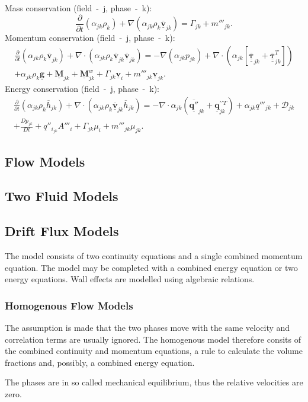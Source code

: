 \documentclass[11pt]{article}
\begin{document}
Mass conservation (field~-~j, phase~-~k):
\begin{equation}
	\frac{\partial}{\partial t}(\alpha_{jk} \rho_{k}) + \nabla (\alpha_{jk} \rho_{k} \overline{\mathbf{\underline{v}}}_{jk}) = \Gamma_{jk} + m'''_{jk}.
\end{equation}
Momentum conservation (field~-~j, phase~-~k):
\begin{multline}
	\frac{\partial}{\partial t}(\alpha_{jk} \rho_{k} \overline{\mathbf{\underline{v}}}_{jk}) + \nabla \cdot (\alpha_{jk} \rho_{k} \overline{\mathbf{\underline{v}}}_{jk} \overline{\mathbf{\underline{v}}}_{jk}) = 
	-\nabla(\alpha_{jk} p_{jk}) + \nabla \cdot (\alpha_{jk} [\underline{\underline{\overline{\mathbf{\tau}}}}_{jk} + \underline{\underline{\overline{\mathbf{\tau}}}}_{jk}^{T}])\\
	+ \alpha_{jk} \rho_{k} \underline{\mathbf{g}} + \underline{\mathbf{M}}_{jk} + \underline{\mathbf{M}}_{jk}^{w} + \Gamma_{jk}\underline{\mathbf{v}}_{i} + m'''_{jk} \underline{\mathbf{v}}_{jk}.
\end{multline}
Energy conservation (field~-~j, phase~-~k):
\begin{multline}
	\frac{\partial}{\partial t}(\alpha_{jk} \rho_{k} \overline{h}_{jk}) + \nabla \cdot (\alpha_{jk} \rho_{k} \overline{\mathbf{\underline{v}}}_{jk} \overline{h}_{jk})
	= -\nabla \cdot \alpha_{jk}(\overline{\underline{\mathbf{q}''}}_{jk} + \underline{\mathbf{q}}^{\prime \prime T}_{jk}) + \alpha_{jk} q'''_{jk} + \mathcal{D}_{jk}\\
	+ \frac{D p_{jk}}{D t} + q''_{i_{jk}} A'''_{i} + \Gamma_{jk}\mu_{i} + m'''_{jk} \mu_{jk}.
\end{multline}
\subsection{Flow Models}
\subsection{Two Fluid Models}
\subsection{Drift Flux Models}
The model consists of two continuity equations and a single combined momentum equation. The model may be completed with a combined energy equation or two energy equations. Wall effects are modelled using algebraic relations.~\cite{tryggvasonDirectNumericalSimulations2011}
\subsubsection{Homogenous Flow Models}
The assumption is made that the two phases move with the same velocity and correlation terms are usually ignored. The homogenous model therefore consits of the combined continuity and momentum equations, a rule to calculate the volume fractions and, possibly, a combined energy equation.~\cite{tryggvasonDirectNumericalSimulations2011}

The phases are in so called mechanical equilibrium, thus the relative velocities are zero.~\cite{wornerCompactIntroductionNumerical}
\printbibliography~
\end{document}
